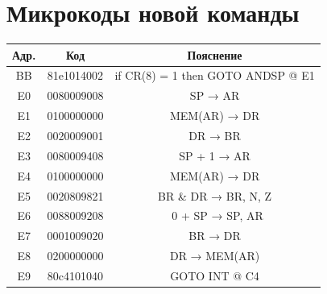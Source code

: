 \documentclass[12pt,a4paper]{report}
\begin{document}
\section*{Микрокоды новой команды}
\begin{tabular}{|c|c|c|}
    \hline
    Адр. & Код & Пояснение \\
    \hline
    BB & 81e1014002 & if CR(8) = 1 then GOTO ANDSP @ E1 \\
    \hline
    \hline
    E0 & 0080009008 & SP → AR \\
    \hline
    E1 & 0100000000 & MEM(AR) → DR \\
    \hline
    E2 & 0020009001 & DR → BR \\
    \hline
    E3 & 0080009408 & SP + 1 → AR \\
    \hline
    E4 & 0100000000 & MEM(AR) → DR \\
    \hline
    E5 & 0020809821 & BR \& DR → BR, N, Z \\
    \hline
    E6 & 0088009208 & ~0 + SP → SP, AR \\
    \hline
    E7 & 0001009020 & BR → DR \\
    \hline
    E8 & 0200000000 & DR → MEM(AR) \\
    \hline
    E9 & 80c4101040 & GOTO INT @ C4 \\
    \hline
\end{tabular}
\end{document}
